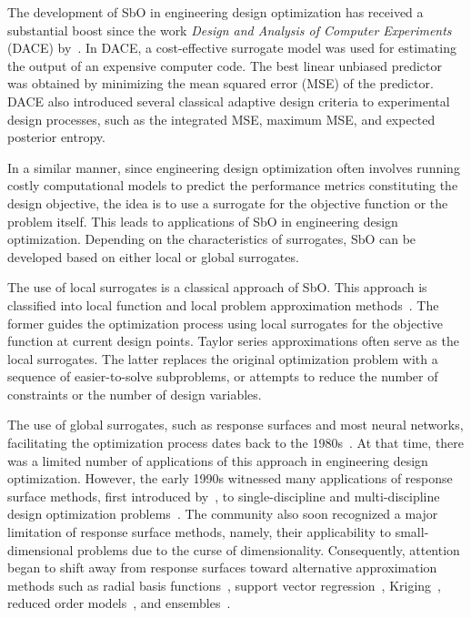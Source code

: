 \documentclass[journal ]{new-aiaa}
\begin{document}
The development of SbO in engineering design optimization has received a substantial boost since the work \textit{Design and Analysis of Computer Experiments} (DACE) by~\citet{Sacks1989}.
In DACE, a cost-effective surrogate model was used for estimating the output of an expensive computer code.
The best linear unbiased predictor was obtained by minimizing the mean squared error (MSE) of the predictor.
DACE also introduced several classical adaptive design criteria to experimental design processes, such as the integrated MSE, maximum MSE, and expected posterior entropy.

In a similar manner, since engineering design optimization often involves running costly computational models to predict the performance metrics constituting the design objective, the idea is to use a surrogate for the objective function or the problem itself.
This leads to applications of SbO in engineering design optimization.
Depending on the characteristics of surrogates, SbO can be developed based on either local or global surrogates.

The use of local surrogates is a classical approach of SbO.
This approach is classified into local function and local problem approximation methods~\citep{Barthelemy1993}.
The former guides the optimization process using local surrogates for the objective function at current design points.
Taylor series approximations often serve as the local surrogates.
The latter replaces the original optimization problem with a sequence of easier-to-solve subproblems, or attempts to reduce the number of constraints or the number of design variables.

The use of global surrogates, such as response surfaces and most neural networks, facilitating the optimization process dates back to the 1980s~\citep{Barthelemy1993}.
At that time, there was a limited number of applications of this approach in engineering design optimization.
However, the early 1990s witnessed many applications of response surface methods, first introduced by~\citet{Box1951}, to single-discipline and multi-discipline design optimization problems~\citep{Sobieski1997}.
The community also soon recognized a major limitation of response surface methods, namely, their applicability to small-dimensional problems due to the curse of dimensionality.
Consequently, attention began to shift away from response surfaces toward alternative approximation methods such as radial basis functions~\citep{Hussain2002}, support vector regression~\citep{Girosi1998}, Kriging~\citep{Cressie1990,Kleijnen2009}, reduced order models~\citep{Antoulas2005}, and ensembles~\citep{Goel2007,LiuH2020}. 
\end{document}
